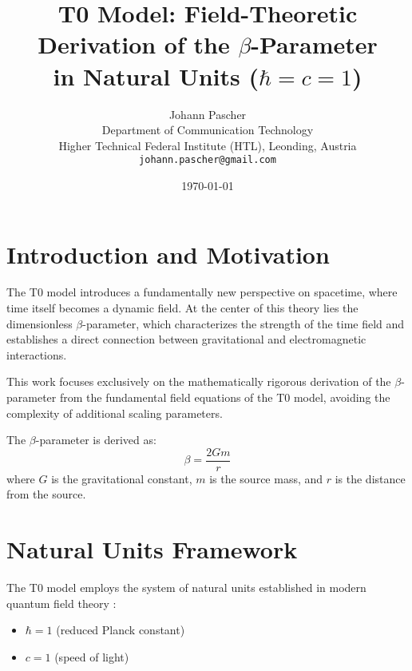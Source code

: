 \documentclass[12pt,a4paper]{article}
\begin{document}
	
	\title{T0 Model: Field-Theoretic Derivation of the $\beta$-Parameter \\
		in Natural Units ($\hbar = c = 1$)}
	\author{Johann Pascher\\
		Department of Communication Technology\\
		Higher Technical Federal Institute (HTL), Leonding, Austria\\
		\texttt{johann.pascher@gmail.com}}
	\date{\today}
	
	\maketitle
	\tableofcontents
	\newpage
	
	\section{Introduction and Motivation}
	\label{sec:introduction}
	
	The T0 model introduces a fundamentally new perspective on spacetime, where time itself becomes a dynamic field. At the center of this theory lies the dimensionless $\beta$-parameter, which characterizes the strength of the time field and establishes a direct connection between gravitational and electromagnetic interactions.
	
	This work focuses exclusively on the mathematically rigorous derivation of the $\beta$-parameter from the fundamental field equations of the T0 model, avoiding the complexity of additional scaling parameters.
	
	\begin{tcolorbox}[colback=blue!5!white,colframe=blue!75!black,title=Central Result]
		The $\beta$-parameter is derived as:
		\begin{equation}
			\boxed{\beta = \frac{2Gm}{r}}
		\end{equation}
		where $G$ is the gravitational constant, $m$ is the source mass, and $r$ is the distance from the source.
	\end{tcolorbox}
	
	\section{Natural Units Framework}
	\label{sec:natural_units}
	
	The T0 model employs the system of natural units established in modern quantum field theory \citep{peskin1995,weinberg1995}:
	
	\begin{itemize}
		\item $\hbar = 1$ (reduced Planck constant)
		\item $c = 1$ (speed of light)
	\end{itemize}
	
\end{document}
